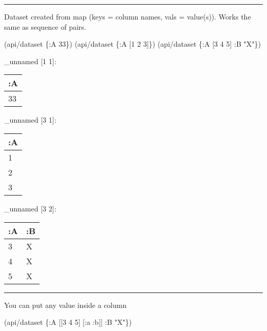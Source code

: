 \documentclass[]{article}
\newenvironment{Shaded}{\begin{snugshade}}{\end{snugshade}}
\newcommand{\AttributeTok}[1]{\textcolor[rgb]{0.77,0.63,0.00}{#1}}
\newcommand{\DecValTok}[1]{\textcolor[rgb]{0.00,0.00,0.81}{#1}}
\newcommand{\NormalTok}[1]{#1}
\newcommand{\StringTok}[1]{\textcolor[rgb]{0.31,0.60,0.02}{#1}}
\begin{document}
\begin{center}\rule{0.5\linewidth}{0.5pt}\end{center}

Dataset created from map (keys = column names, vals = value(s)). Works
the same as sequence of pairs.

\begin{Shaded}
\begin{Highlighting}[]
\NormalTok{(api/dataset \{}\AttributeTok{:A} \DecValTok{33}\NormalTok{\})}
\NormalTok{(api/dataset \{}\AttributeTok{:A}\NormalTok{ [}\DecValTok{1} \DecValTok{2} \DecValTok{3}\NormalTok{]\})}
\NormalTok{(api/dataset \{}\AttributeTok{:A}\NormalTok{ [}\DecValTok{3} \DecValTok{4} \DecValTok{5}\NormalTok{] }\AttributeTok{:B} \StringTok{"X"}\NormalTok{\})}
\end{Highlighting}
\end{Shaded}

\_unnamed {[}1 1{]}:

\begin{longtable}[]{@{}l@{}}
\toprule
:A\tabularnewline
\midrule
\endhead
33\tabularnewline
\bottomrule
\end{longtable}

\_unnamed {[}3 1{]}:

\begin{longtable}[]{@{}l@{}}
\toprule
:A\tabularnewline
\midrule
\endhead
1\tabularnewline
2\tabularnewline
3\tabularnewline
\bottomrule
\end{longtable}

\_unnamed {[}3 2{]}:

\begin{longtable}[]{@{}ll@{}}
\toprule
:A & :B\tabularnewline
\midrule
\endhead
3 & X\tabularnewline
4 & X\tabularnewline
5 & X\tabularnewline
\bottomrule
\end{longtable}

\begin{center}\rule{0.5\linewidth}{0.5pt}\end{center}

You can put any value inside a column

\begin{Shaded}
\begin{Highlighting}[]
\NormalTok{(api/dataset \{}\AttributeTok{:A}\NormalTok{ [[}\DecValTok{3} \DecValTok{4} \DecValTok{5}\NormalTok{] [}\AttributeTok{:a} \AttributeTok{:b}\NormalTok{]] }\AttributeTok{:B} \StringTok{"X"}\NormalTok{\})}
\end{Highlighting}
\end{Shaded}
\end{document}
